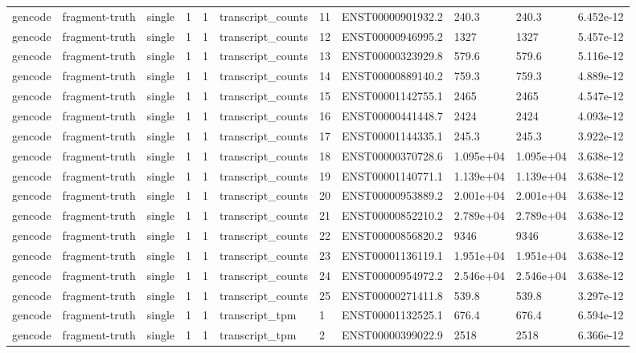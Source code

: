 \begin{tabular}{lllllllllll}
gencode & fragment-truth & single & 1 & 1 & transcript\_counts & 11 & ENST00000901932.2 & 240.3 & 240.3 & 6.452e-12 \\
gencode & fragment-truth & single & 1 & 1 & transcript\_counts & 12 & ENST00000946995.2 & 1327 & 1327 & 5.457e-12 \\
gencode & fragment-truth & single & 1 & 1 & transcript\_counts & 13 & ENST00000323929.8 & 579.6 & 579.6 & 5.116e-12 \\
gencode & fragment-truth & single & 1 & 1 & transcript\_counts & 14 & ENST00000889140.2 & 759.3 & 759.3 & 4.889e-12 \\
gencode & fragment-truth & single & 1 & 1 & transcript\_counts & 15 & ENST00001142755.1 & 2465 & 2465 & 4.547e-12 \\
gencode & fragment-truth & single & 1 & 1 & transcript\_counts & 16 & ENST00000441448.7 & 2424 & 2424 & 4.093e-12 \\
gencode & fragment-truth & single & 1 & 1 & transcript\_counts & 17 & ENST00001144335.1 & 245.3 & 245.3 & 3.922e-12 \\
gencode & fragment-truth & single & 1 & 1 & transcript\_counts & 18 & ENST00000370728.6 & 1.095e+04 & 1.095e+04 & 3.638e-12 \\
gencode & fragment-truth & single & 1 & 1 & transcript\_counts & 19 & ENST00001140771.1 & 1.139e+04 & 1.139e+04 & 3.638e-12 \\
gencode & fragment-truth & single & 1 & 1 & transcript\_counts & 20 & ENST00000953889.2 & 2.001e+04 & 2.001e+04 & 3.638e-12 \\
gencode & fragment-truth & single & 1 & 1 & transcript\_counts & 21 & ENST00000852210.2 & 2.789e+04 & 2.789e+04 & 3.638e-12 \\
gencode & fragment-truth & single & 1 & 1 & transcript\_counts & 22 & ENST00000856820.2 & 9346 & 9346 & 3.638e-12 \\
gencode & fragment-truth & single & 1 & 1 & transcript\_counts & 23 & ENST00001136119.1 & 1.951e+04 & 1.951e+04 & 3.638e-12 \\
gencode & fragment-truth & single & 1 & 1 & transcript\_counts & 24 & ENST00000954972.2 & 2.546e+04 & 2.546e+04 & 3.638e-12 \\
gencode & fragment-truth & single & 1 & 1 & transcript\_counts & 25 & ENST00000271411.8 & 539.8 & 539.8 & 3.297e-12 \\
gencode & fragment-truth & single & 1 & 1 & transcript\_tpm & 1 & ENST00001132525.1 & 676.4 & 676.4 & 6.594e-12 \\
gencode & fragment-truth & single & 1 & 1 & transcript\_tpm & 2 & ENST00000399022.9 & 2518 & 2518 & 6.366e-12 \\

\end{tabular}
